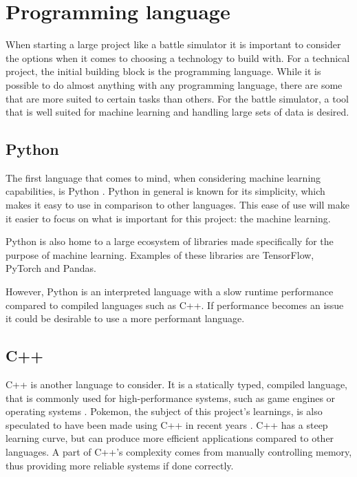 \section{Programming language}
\label{sec:choice-of-language}

When starting a large project like a battle simulator it is important to consider the options when it comes to choosing a technology to build with.
For a technical project, the initial building block is the programming language. While it is possible to do almost anything with any 
programming language, there are some that are more suited to certain tasks than others. For the battle simulator, a tool that is well 
suited for machine learning and handling large sets of data is desired.

\subsection{Python}
The first language that comes to mind, when considering machine learning capabilities, is Python \cite{PythonForMachineLearning}.
Python in general is known for its simplicity, which makes it easy to use in comparison to other languages. This ease of use will make it
easier to focus on what is important for this project: the machine learning.

Python is also home to a large ecosystem of libraries made specifically for the purpose of machine learning. Examples of these libraries are
TensorFlow, PyTorch and Pandas.

However, Python is an interpreted language with a slow runtime performance compared to compiled languages such as C++. 
If performance becomes an issue it could be desirable to use a more performant language.


\subsection{C++}
C++ is another language to consider. It is a statically typed, compiled language, that is commonly used for high-performance systems, such as
game engines or operating systems \cite{C++}. Pokemon, the subject of this project's learnings, is also speculated to have been made using C++ in recent years \cite{PokemonProgrammingLanguageForumPost}\cite{NintendoDataLeak}\cite{ChatGPTPokemonProgrammingLanguage}.
C++ has a steep learning curve, but can produce more efficient applications compared to other languages. 
A part of C++'s complexity comes from manually controlling memory, thus providing more reliable systems if done correctly. 

